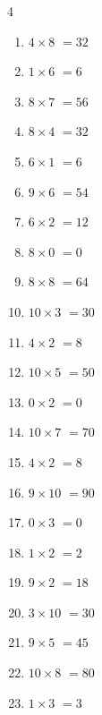 \begin{multicols}{4}
\begin{enumerate}
  \item $4\times 8$
        $=32$

  \item $1\times 6$
        $=6$

  \item $8\times 7$
        $=56$

  \item $8\times 4$
        $=32$

  \item $6\times 1$
        $=6$

  \item $9\times 6$
        $=54$

  \item $6\times 2$
        $=12$

  \item $8\times 0$
        $=0$

  \item $8\times 8$
        $=64$

  \item $10\times 3$
        $=30$

  \item $4\times 2$
        $=8$

  \item $10\times 5$
        $=50$

\columnbreak %

  \item $0\times 2$
        $=0$

  \item $10\times 7$
        $=70$

  \item $4\times 2$
        $=8$

  \item $9\times 10$
        $=90$

  \item $0\times 3$
        $=0$

  \item $1\times 2$
        $=2$

  \item $9\times 2$
        $=18$

  \item $3\times 10$
        $=30$

  \item $9\times 5$
        $=45$

  \item $10\times 8$
        $=80$

  \item $1\times 3$
        $=3$


\end{enumerate}
\end{multicols}
